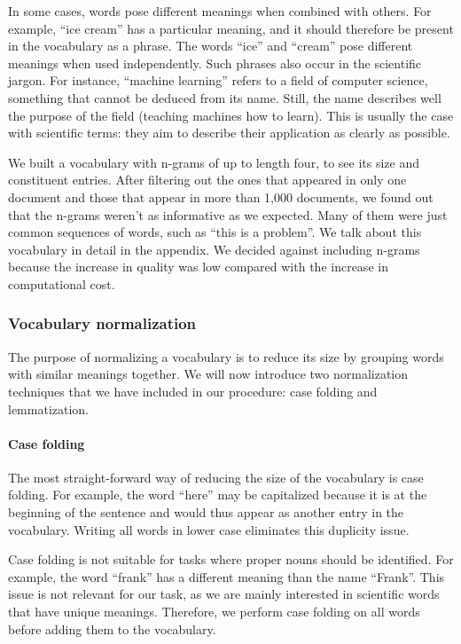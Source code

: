 In some cases, words pose different meanings when combined with others. For example, ``ice cream'' has a particular meaning, and it should therefore be present in the vocabulary as a phrase. The words ``ice'' and ``cream'' pose different meanings when used independently. Such phrases also occur in the scientific jargon. For instance, ``machine learning'' refers to a field of computer science, something that cannot be deduced from its name. Still, the name describes well the purpose of the field (teaching machines how to learn). This is usually the case with scientific terms: they aim to describe their application as clearly as possible.

We built a vocabulary with n-grams of up to length four, to see its size and constituent entries. After filtering out the ones that appeared in only one document and those that appear in more than 1,000 documents, we found out that the n-grams weren't as informative as we expected. Many of them were just common sequences of words, such as ``this is a problem''. We talk about this vocabulary in detail in the appendix. We decided against including n-grams because the increase in quality was low compared with the increase in computational cost. 

\subsubsection{Vocabulary normalization}

The purpose of normalizing a vocabulary is to reduce its size by grouping words with similar meanings together. We will now introduce two normalization techniques that we have included in our procedure: case folding and lemmatization.

\paragraph{Case folding} \mbox{}

The most straight-forward way of reducing the size of the vocabulary is case folding. For example, the word ``here'' may be capitalized because it is at the beginning of the sentence and would thus appear as another entry in the vocabulary. Writing all words in lower case eliminates this duplicity issue.

Case folding is not suitable for tasks where proper nouns should be identified. For example, the word ``frank'' has a different meaning than the name ``Frank''. This issue is not relevant for our task, as we are mainly interested in scientific words that have unique meanings. Therefore, we perform case folding on all words before adding them to the vocabulary.

